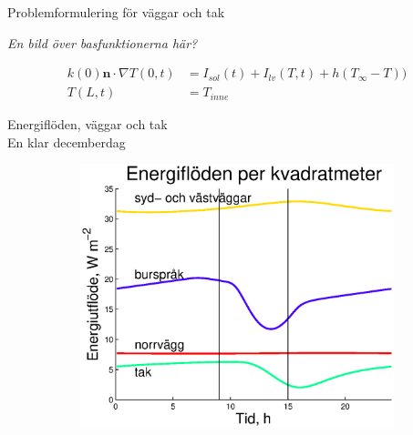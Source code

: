 \begin{frame}{Problemformulering för väggar och tak}

\emph{\color{red} En bild över basfunktionerna här?}

\begin{align}
k(0)\mathbf{n}\cdot\nabla T(0,t) & = I_{sol}(t) + I_{lv}(T,t) + h(T_\infty-T))
\nonumber \\
T(L,t) & = T_{inne} \nonumber 
\end{align}

\end{frame}

\begin{frame}{Energiflöden, väggar och tak\\En klar decemberdag}
 
\begin{figure}
        \begin{subfigure}[b]{0.48\textwidth}
                \centering
                \includegraphics[width=\textwidth]{images/walls1.eps}
        \end{subfigure}
\end{figure}
\end{frame}
